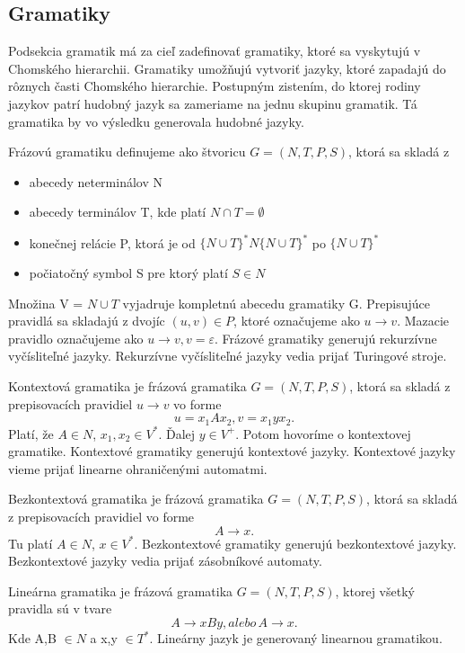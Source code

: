 \subsection{Gramatiky}
Podsekcia gramatik má za cieľ zadefinovať gramatiky, ktoré sa vyskytujú v Chomského hierarchii. Gramatiky umožňujú vytvoriť jazyky, ktoré zapadajú do rôznych časti Chomského hierarchie. Postupným zistením, do ktorej rodiny jazykov patrí hudobný jazyk sa zameriame na jednu skupinu gramatik. Tá gramatika by vo výsledku generovala hudobné jazyky.

\begin{definition}
\label{def:frazgram}
Frázovú gramatiku definujeme ako štvoricu $G = (N,T,P,S)$, ktorá sa skladá z 
\begin{itemize}\itemsep0.05em
    \item abecedy neterminálov N
    \item abecedy terminálov T, kde platí $N \cap T = \emptyset$
    \item konečnej relácie P, ktorá je od $\{N \cup T\}^*N\{N \cup T\}^*$ po $\{N \cup T\}^*$
    \item počiatočný symbol S pre ktorý platí $S \in N$
\end{itemize}

Množina V = $N \cup T$ vyjadruje kompletnú abecedu gramatiky G. Prepisujúce pravidlá sa skladajú z dvojíc $(u,v) \in P$, ktoré označujeme ako $u \rightarrow v$. Mazacie pravidlo označujeme ako $u \rightarrow v, v = \varepsilon$. Frázové gramatiky generujú rekurzívne vyčísliteľné jazyky. Rekurzívne vyčísliteľné jazyky vedia prijať Turingové stroje.
\end{definition}

\begin{definition}
\label{def:kontextgram}
Kontextová gramatika je frázová gramatika $G = (N,T,P,S)$, ktorá sa skladá z prepisovacích pravidiel $u \rightarrow v$ vo forme $$u = x_1Ax_2, v = x_1yx_2.$$ Platí, že $A \in N$, $x_1, x_2 \in V^*$. Ďalej $y \in V^+$. Potom hovoríme o kontextovej gramatike. Kontextové gramatiky generujú kontextové jazyky. Kontextové jazyky vieme prijať linearne ohraničenými automatmi.
\end{definition}

\begin{definition}
\label{def:nonkontextgram}
Bezkontextová gramatika je frázová gramatika $G = (N,T,P,S)$, ktorá sa skladá z prepisovacích pravidiel vo forme $$A \rightarrow x.$$ Tu platí $A \in N$, $x \in V^*$. Bezkontextové gramatiky generujú bezkontextové jazyky. Bezkontextové jazyky vedia prijať zásobníkové automaty.
\end{definition}
\begin{definition}
\label{def:lingram}
Lineárna gramatika je frázová gramatika $G = (N,T,P,S)$, ktorej všetký pravidla sú v tvare $$A \rightarrow xBy, alebo \, A \rightarrow x.$$ Kde A,B $ \in N$ a x,y $ \in T^*$. Lineárny jazyk je generovaný linearnou gramatikou.
\end{definition}

